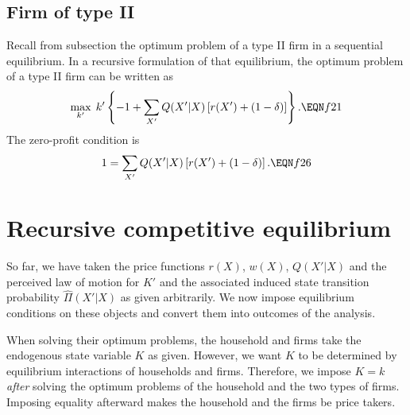 \subsection{Firm of type II}
Recall from subsection  the optimum problem
of a type II firm in a sequential equilibrium. In a recursive
formulation of that equilibrium, the optimum problem of a type II
firm can be written as
$$ \max_{k'}   \; k' \left\{ -1 + \sum_{X'} Q(X'|X) \left[r(X') + (1-\delta)
                           \right]\right\} .    \EQN f21  $$
The zero-profit condition is
$$ 1 = \sum_{X'} Q(X'|X) \left[r(X') +  (1-\delta) \right]. \EQN f26 $$








\section{Recursive competitive equilibrium}
So far, we have taken the price functions
$r(X)$, $w(X)$, $Q(X'|X)$ and the perceived law of motion  for $K'$
and the associated induced  state transition probability $\hat \Pi(X'|X)$
as given arbitrarily. We now
impose equilibrium conditions on these objects and convert 
them into outcomes of the analysis.


When solving their optimum problems, the household and firms take
the endogenous state variable $K$ as given.  However, we want $K$
to be determined by  equilibrium interactions of households
and firms.  Therefore, we impose $K=k$ {\it after\/} solving the
optimum problems of the household and the two types of firms.
Imposing equality afterward makes the household and the firms
be price takers.


